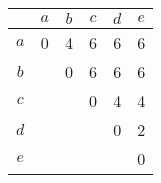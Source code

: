 \documentclass{standalone}
\begin{document}
\begin{tabular}{c | c | c | c | c | c}
        & $a$  & $b$  & $c$  & $d$  & $e$  \\
    \hline
    $a$ & 0    & 4    & 6    & 6    & 6    \\
    $b$ &      & 0    & 6    & 6    & 6    \\
    $c$ &      &      & 0    & 4    & 4    \\
    $d$ &      &      &      & 0    & 2    \\
    $e$ &      &      &      &      & 0    \\
\end{tabular}
\end{document}
